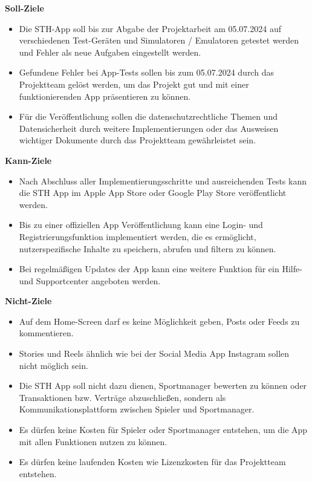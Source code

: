\textbf{Soll-Ziele}
\begin{itemize}
    \item Die STH-App soll bis zur Abgabe der Projektarbeit am 05.07.2024 auf verschiedenen Test-Geräten und Simulatoren / Emulatoren getestet werden und Fehler als neue Aufgaben eingestellt werden.
    \item Gefundene Fehler bei App-Tests sollen bis zum 05.07.2024 durch das Projektteam gelöst werden, um das Projekt gut und mit einer funktionierenden App präsentieren zu können.
    \item Für die Veröffentlichung sollen die datenschutzrechtliche Themen und Datensicherheit durch weitere Implementierungen oder das Ausweisen wichtiger Dokumente durch das Projektteam gewährleistet sein.
\end{itemize}

\textbf{Kann-Ziele}
\begin{itemize}
    \item Nach Abschluss aller Implementierungsschritte und ausreichenden Tests kann die STH App im Apple App Store oder Google Play Store veröffentlicht werden.
    \item Bis zu einer offiziellen App Veröffentlichung kann eine Login- und Registrierungsfunktion implementiert werden, die es ermöglicht, nutzerspezifische Inhalte zu speichern, abrufen und filtern zu können.
    \item Bei regelmäßigen Updates der App kann eine weitere Funktion für ein Hilfe- und Supportcenter angeboten werden.
\end{itemize}

\textbf{Nicht-Ziele}
\begin{itemize}
    \item Auf dem Home-Screen darf es keine Möglichkeit geben, Posts oder Feeds zu kommentieren.
    \item Stories und Reels ähnlich wie bei der Social Media App Instagram sollen nicht möglich sein.
    \item Die STH App soll nicht dazu dienen, Sportmanager bewerten zu können oder Transaktionen bzw. Verträge abzuschließen, sondern als Kommunikationsplattform zwischen Spieler und Sportmanager.
    \item Es dürfen keine Kosten für Spieler oder Sportmanager entstehen, um die App mit allen Funktionen nutzen zu können.
    \item Es dürfen keine laufenden Kosten wie Lizenzkosten für das Projektteam entstehen.
\end{itemize}

